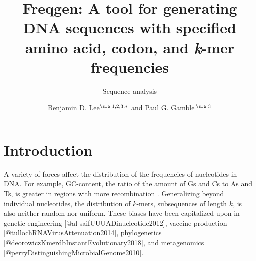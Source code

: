 \documentclass{bioinfo}
\begin{document}

\subtitle{Sequence analysis}

\title[Freqgen]{Freqgen: A tool for generating DNA sequences with specified amino acid, codon, and \textit{k}-mer frequencies}
\author[Lee and Gamble]{Benjamin D. Lee$^{\text{\sfb 1,2,3,}*}$ and Paul G. Gamble\,$^{\text{\sfb 3}}$}
\address{$^{\text{\sf 1}}$School of Engineering and Applied Sciences, Harvard University, Cambridge, MA, 02138, USA, \\
$^{\text{\sf 2}}$Department of Genetics, Harvard Medical School, Boston, MA, 02115, USA, and \\ $^{\text{\sf 3}}$Lab41, In-Q-Tel, Menlo Park, CA, 94025, USA}





\maketitle

\section{Introduction}

A variety of forces affect the distribution of the frequencies of nucleotides in DNA. For example, GC-content, the ratio of the amount of Gs and Cs to As and Ts, is greater in regions with more recombination \citep{spencerHumanPolymorphismRecombination2006}. Generalizing beyond individual nucleotides, the distribution of $k$-mers, subsequences of length $k$, is also neither random nor uniform. These biases have been capitalized upon in genetic engineering [@al-saifUUUADinucleotide2012], vaccine production [@tullochRNAVirusAttenuation2014], phylogenetics [@deorowiczKmerdbInstantEvolutionary2018], and metagenomics [@perryDistinguishingMicrobialGenome2010].
\end{document}

